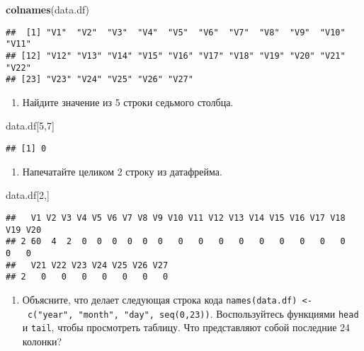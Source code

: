 \documentclass[]{article}
\newenvironment{Shaded}{\begin{snugshade}}{\end{snugshade}}
\newcommand{\KeywordTok}[1]{\textcolor[rgb]{0.13,0.29,0.53}{\textbf{#1}}}
\newcommand{\DecValTok}[1]{\textcolor[rgb]{0.00,0.00,0.81}{#1}}
\newcommand{\NormalTok}[1]{#1}
\providecommand{\tightlist}{%
  \setlength{\itemsep}{0pt}\setlength{\parskip}{0pt}}
\begin{document}
\begin{Shaded}
\begin{Highlighting}[]
\KeywordTok{colnames}\NormalTok{(data.df)}
\end{Highlighting}
\end{Shaded}

\begin{verbatim}
##  [1] "V1"  "V2"  "V3"  "V4"  "V5"  "V6"  "V7"  "V8"  "V9"  "V10" "V11"
## [12] "V12" "V13" "V14" "V15" "V16" "V17" "V18" "V19" "V20" "V21" "V22"
## [23] "V23" "V24" "V25" "V26" "V27"
\end{verbatim}

\begin{enumerate}
\def\labelenumi{\arabic{enumi}.}
\setcounter{enumi}{3}
\tightlist
\item
  Найдите значение из 5 строки седьмого столбца.
\end{enumerate}

\begin{Shaded}
\begin{Highlighting}[]
\NormalTok{data.df[}\DecValTok{5}\NormalTok{,}\DecValTok{7}\NormalTok{]}
\end{Highlighting}
\end{Shaded}

\begin{verbatim}
## [1] 0
\end{verbatim}

\begin{enumerate}
\def\labelenumi{\arabic{enumi}.}
\setcounter{enumi}{4}
\tightlist
\item
  Напечатайте целиком 2 строку из датафрейма.
\end{enumerate}

\begin{Shaded}
\begin{Highlighting}[]
\NormalTok{data.df[}\DecValTok{2}\NormalTok{,]}
\end{Highlighting}
\end{Shaded}

\begin{verbatim}
##   V1 V2 V3 V4 V5 V6 V7 V8 V9 V10 V11 V12 V13 V14 V15 V16 V17 V18 V19 V20
## 2 60  4  2  0  0  0  0  0  0   0   0   0   0   0   0   0   0   0   0   0
##   V21 V22 V23 V24 V25 V26 V27
## 2   0   0   0   0   0   0   0
\end{verbatim}

\begin{enumerate}
\def\labelenumi{\arabic{enumi}.}
\setcounter{enumi}{5}
\tightlist
\item
  Объясните, что делает следующая строка кода
  \texttt{names(data.df)\ \textless{}-\ c("year",\ "month",\ "day",\ seq(0,23))}.
  Воспользуйтесь функциями \texttt{head} и \texttt{tail}, чтобы
  просмотреть таблицу. Что представляют собой последние 24 колонки?
\end{enumerate}
\end{document}
